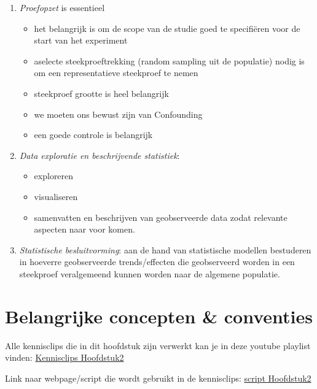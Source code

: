 \documentclass[
  dutch,
  letterpaper,
  12pt]{book}
\providecommand{\tightlist}{%
  \setlength{\itemsep}{0pt}\setlength{\parskip}{0pt}}
\theoremstyle{definition}
\theoremstyle{definition}
\theoremstyle{definition}
\theoremstyle{remark}
\begin{document}
\begin{enumerate}
\def\labelenumi{\arabic{enumi}.}
\item
  \emph{Proefopzet} is essentieel

  \begin{itemize}
  \item
    het belangrijk is om de scope van de studie goed te specifiëren voor
    de start van het experiment
  \item
    aselecte steekproeftrekking (random sampling uit de populatie) nodig
    is om een representatieve steekproef te nemen
  \item
    steekproef grootte is heel belangrijk
  \item
    we moeten ons bewust zijn van Confounding
  \item
    een goede controle is belangrijk
  \end{itemize}
\item
  \emph{Data exploratie en beschrijvende statistiek}:

  \begin{itemize}
  \tightlist
  \item
    exploreren
  \item
    visualiseren
  \item
    samenvatten en beschrijven van geobserveerde data zodat relevante
    aspecten naar voor komen.
  \end{itemize}
\item
  \emph{Statistische besluitvorming}: aan de hand van statistische
  modellen bestuderen in hoeverre geobserveerde trends/effecten die
  geobserveerd worden in een steekproef veralgemeend kunnen worden naar
  de algemene populatie.
\end{enumerate}


\chapter{Belangrijke concepten \&
conventies}\label{belangrijke-concepten-conventies}

Alle kennisclips die in dit hoofdstuk zijn verwerkt kan je in deze
youtube playlist vinden:
\href{https://www.youtube.com/playlist?list=PLZH1hP8_LbJJ7apU5sAbRlUsve2nWz5ev}{Kennisclips
Hoofdstuk2}

Link naar webpage/script die wordt gebruikt in de kennisclips:
\href{https://statomics.github.io/sbc/rmd/02-concepts.html}{script
Hoofdstuk2}
\end{document}
